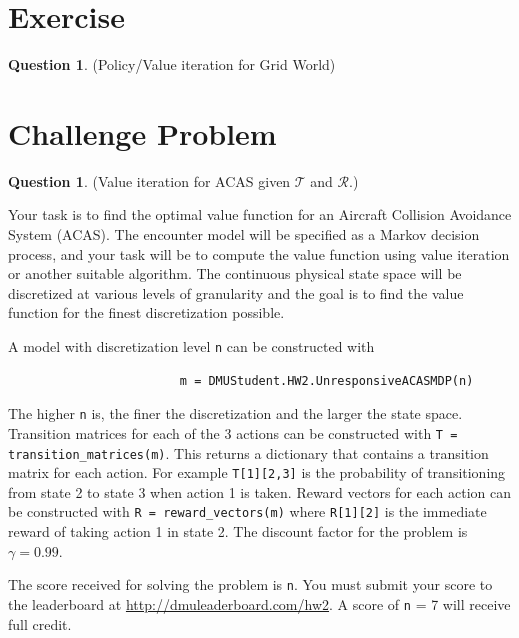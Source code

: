\documentclass{article}
\theoremstyle{definition}
\newtheorem{question}[thm]{Question}
\begin{document}
\section{Exercise}

\begin{question}
    (Policy/Value iteration for Grid World)
\end{question}

\section{Challenge Problem}

\begin{question}
    (Value iteration for ACAS given $\mathcal{T}$ and $\mathcal{R}$.)

Your task is to find the optimal value function for an Aircraft Collision Avoidance System (ACAS). The encounter model will be specified as a Markov decision process, and your task will be to compute the value function using value iteration or another suitable algorithm. The continuous physical state space will be discretized at various levels of granularity and the goal is to find the value function for the finest discretization possible.

A model with discretization level \texttt{n} can be constructed with
\begin{verbatim}
                        m = DMUStudent.HW2.UnresponsiveACASMDP(n)
\end{verbatim}
The higher \texttt{n} is, the finer the discretization and the larger the state space. Transition matrices for each of the 3 actions can be constructed with \texttt{T = transition\_matrices(m)}. This returns a dictionary that contains a transition matrix for each action. For example \texttt{T[1][2,3]} is the probability of transitioning from state 2 to state 3 when action 1 is taken. Reward vectors for each action can be constructed with \texttt{R = reward\_vectors(m)} where \texttt{R[1][2]} is the immediate reward of taking action 1 in state 2.
The discount factor for the problem is $\gamma = 0.99$.

The score received for solving the problem is \texttt{n}. You must submit your score to the leaderboard at \url{http://dmuleaderboard.com/hw2}. A score of \texttt{n} = 7 will receive full credit.

\vspace{1em}
\noindent\makebox[\linewidth]{\rule{\textwidth}{0.4pt}}
\vspace{1em}


\end{question}
\end{document}

